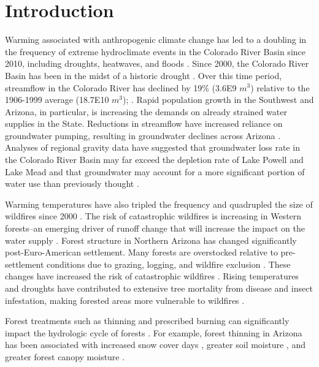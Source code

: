 \documentclass[
  number,
  preprint,
  3p,
  onecolumn]{elsarticle}
\begin{document}
\section{Introduction}\label{sec-intro}

Warming associated with anthropogenic climate change has led to a
doubling in the frequency of extreme hydroclimate events in the Colorado
River Basin since 2010, including droughts, heatwaves, and floods
\citep{bennett_concurrent_2021}. Since 2000, the Colorado River Basin
has been in the midst of a historic drought
\citep{meko_treering_2022, williams_rapid_2022}. Over this time period,
streamflow in the Colorado River has declined by 19\% (3.6E9 \(m^3\))
relative to the 1906-1999 average (18.7E10 \(m^3\));
\citep{hogan_recent_2024, udall_twentyfirst_2017}. Rapid population
growth in the Southwest and Arizona, in particular, is increasing the
demands on already strained water supplies in the State. Reductions in
streamflow have increased reliance on groundwater pumping, resulting in
groundwater declines across Arizona \citep{tadych_historical_2024}.
Analyses of regional gravity data have suggested that groundwater loss
rate in the Colorado River Basin may far exceed the depletion rate of
Lake Powell and Lake Mead and that groundwater may account for a more
significant portion of water use than previously thought
\citep{castle2014}.

Warming temperatures have also tripled the frequency and quadrupled the
size of wildfires since 2000 \citep{iglesias2022}. The risk of
catastrophic wildfires is increasing in Western forests--an emerging
driver of runoff change that will increase the impact on the water
supply \citep{williams_rapid_2022}. Forest structure in Northern Arizona
has changed significantly post-Euro-American settlement. Many forests
are overstocked relative to pre-settlement conditions due to grazing,
logging, and wildfire exclusion
\citep{covington_southwestern_1994, friederici2013}. These changes have
increased the risk of catastrophic wildfires \citep{allen2002}. Rising
temperatures and droughts have contributed to extensive tree mortality
from disease and insect infestation, making forested areas more
vulnerable to wildfires \citep{berner_tree_2017}.

Forest treatments such as thinning and prescribed burning can
significantly impact the hydrologic cycle of forests
\citep{del_campo_global_2022}. For example, forest thinning in Arizona
has been associated with increased snow cover days
\citep{sankey_multi-scale_2015, belmonte2021, donager_integrating_2021},
greater soil moisture \citep{belmonte_soil_2022, sankey_thinning_2022},
and greater forest canopy moisture \citep{sankey_regionalscale_2021}.
\end{document}
